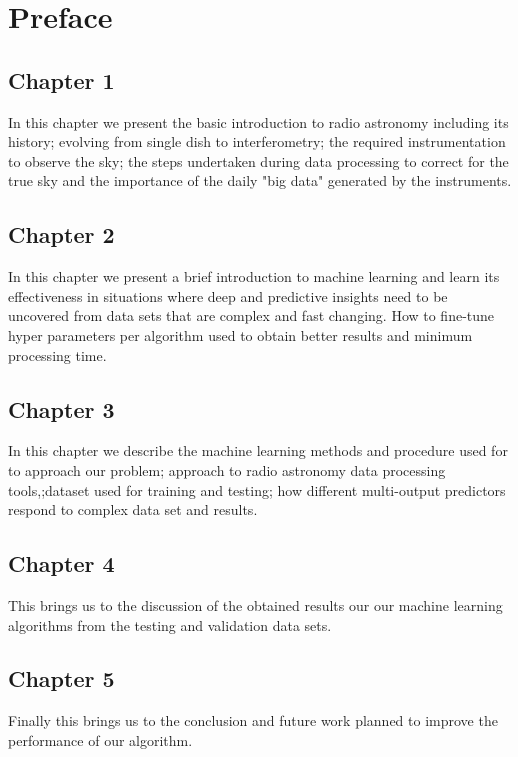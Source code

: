 \chapter*{Preface}

\section*{Chapter 1}
In this chapter we present the basic introduction to radio astronomy including its history; evolving from single dish to interferometry; the required instrumentation to observe the sky; the steps undertaken during data processing to correct for the true sky and the importance of the daily "big data" generated by the instruments.    
\section*{Chapter 2}
In this chapter we present a brief introduction to machine learning and learn its effectiveness in situations where deep and predictive insights need to be uncovered from data sets that are complex and fast changing. How to fine-tune hyper parameters per algorithm used to obtain better results and minimum processing time.  
\section*{Chapter 3}
In this chapter we describe the machine learning methods and procedure used for to approach our problem; approach to radio astronomy data processing tools,;dataset used for training and testing; how different multi-output predictors respond to complex data set and results.
\section*{Chapter 4}
This brings us to the discussion of the obtained results our our machine learning algorithms from the testing and validation data sets. 
\section*{Chapter 5}
Finally this brings us to the conclusion and future work planned to improve the performance of our algorithm.

